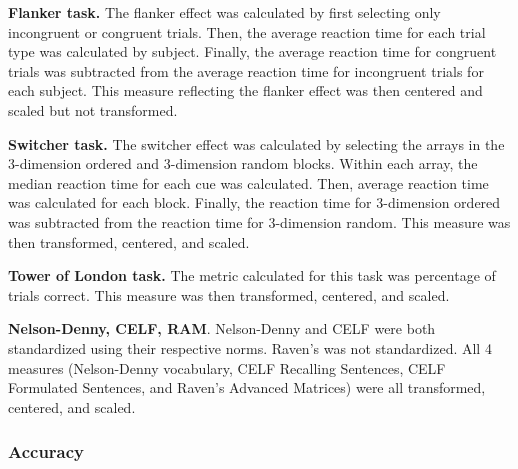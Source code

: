 \documentclass[../dissertation.tex]{subfiles}
\begin{document}
	\textbf{Flanker task.} The flanker effect was calculated by first selecting only incongruent or congruent trials. Then, the average reaction time for each trial type was calculated by subject. Finally, the average reaction time for congruent trials was subtracted from the average reaction time for incongruent trials for each subject. This measure reflecting the flanker effect was then centered and scaled but not transformed. \par
	\textbf{Switcher task.} The switcher effect was calculated by selecting the arrays in the 3-dimension ordered and 3-dimension random blocks. Within each array, the median reaction time for each cue was calculated. Then, average reaction time was calculated for each block. Finally, the reaction time for 3-dimension ordered was subtracted from the reaction time for 3-dimension random. This measure was then transformed, centered, and scaled. \par 
	\textbf{Tower of London task.} The metric calculated for this task was percentage of trials correct. This measure was then transformed, centered, and scaled. \par 
	\textbf{Nelson-Denny, CELF, RAM}. Nelson-Denny and CELF were both standardized using their respective norms. Raven's was not standardized. All 4 measures (Nelson-Denny vocabulary, CELF Recalling Sentences, CELF Formulated Sentences, and Raven's Advanced Matrices) were all transformed, centered, and scaled.
	
\subsubsection{Accuracy}
\end{document}

